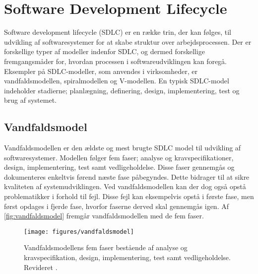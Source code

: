 \section{Software Development Lifecycle}
Software development lifecycle (SDLC) er en række trin, der kan følges, til udvikling af softwaresystemer for at skabe struktur over arbejdsprocessen. Der er forskellige typer af modeller indenfor SDLC, og dermed forskellige fremgangsmåder for, hvordan processen i softwareudviklingen kan foregå. Eksempler på SDLC-modeller, som anvendes i virksomheder, er vandfaldsmodellen, spiralmodellen og V-modellen. En typisk SDLC-model indeholder stadierne; planlægning, definering, design, implementering, test og brug af systemet.\cite{Jain2011}

\subsection{Vandfaldsmodel} \label{sec:vandfald}
Vandfaldsmodellen er den ældste og mest brugte SDLC model til udvikling af softwaresystemer. Modellen følger fem faser; analyse og kravspecifikationer, design, implementering, test samt vedligeholdelse. Disse faser gennemgås og dokumenteres enkeltvis førend næste fase påbegyndes. Dette bidrager til at sikre kvaliteten af systemudviklingen. Ved vandfaldsmodellen kan der dog også opstå problematikker i forhold til fejl. Disse fejl kan eksempelvis opstå i første fase, men først opdages i fjerde fase, hvorfor faserne derved skal gennemgås igen.\cite{Alshamrani2015,Bassil2012} Af \autoref{fig:vandfaldsmodel} fremgår vandfaldsmodellen med de fem faser. 

\begin{figure} [H]
\centering
\texttt{[image: figures/vandfaldsmodel]}
\caption{Vandfaldsmodellens fem faser bestående af analyse og kravspecifikation, design, implementering, test samt vedligeholdelse. Revideret \cite{Alshamrani2015,Bassil2012}.}
\label{fig:vandfaldsmodel}
\end{figure} 

